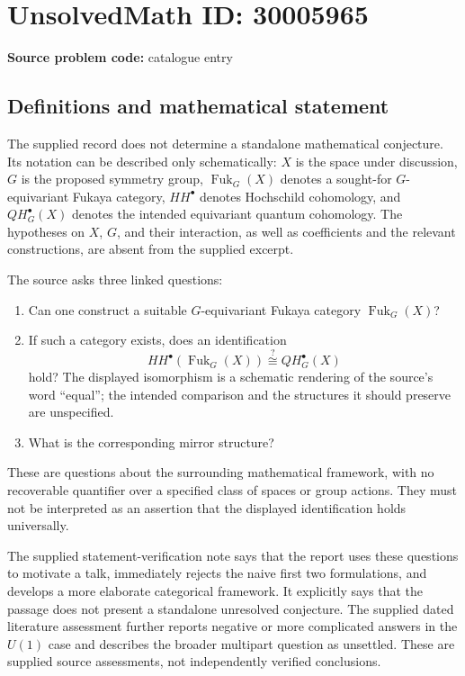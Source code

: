 \documentclass[11pt]{article}
\begin{document}
\section*{UnsolvedMath ID: 30005965}
\textbf{Source problem code:} catalogue entry
\subsection{Definitions and mathematical statement}
The supplied record does not determine a standalone mathematical conjecture. Its notation can be described only schematically: \(X\) is the space under discussion, \(G\) is the proposed symmetry group, \(\operatorname{Fuk}_{G}(X)\) denotes a sought-for \(G\)-equivariant Fukaya category, \(HH^{\bullet}\) denotes Hochschild cohomology, and \(QH^{\bullet}_{G}(X)\) denotes the intended equivariant quantum cohomology. The hypotheses on \(X\), \(G\), and their interaction, as well as coefficients and the relevant constructions, are absent from the supplied excerpt.

The source asks three linked questions:
\begin{enumerate}
\item Can one construct a suitable \(G\)-equivariant Fukaya category \(\operatorname{Fuk}_{G}(X)\)?
\item If such a category exists, does an identification
\[
HH^{\bullet}\!\left(\operatorname{Fuk}_{G}(X)\right)
\stackrel{?}{\cong} QH^{\bullet}_{G}(X)
\]
hold? The displayed isomorphism is a schematic rendering of the source's word ``equal''; the intended comparison and the structures it should preserve are unspecified.
\item What is the corresponding mirror structure?
\end{enumerate}
These are questions about the surrounding mathematical framework, with no recoverable quantifier over a specified class of spaces or group actions. They must not be interpreted as an assertion that the displayed identification holds universally.

The supplied statement-verification note says that the report uses these questions to motivate a talk, immediately rejects the naive first two formulations, and develops a more elaborate categorical framework. It explicitly says that the passage does not present a standalone unresolved conjecture. The supplied dated literature assessment further reports negative or more complicated answers in the \(U(1)\) case and describes the broader multipart question as unsettled. These are supplied source assessments, not independently verified conclusions.
\end{document}
